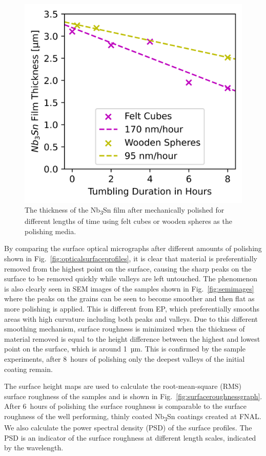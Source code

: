 \begin{figure}[t]%
\centering%
\includegraphics[width=0.8\columnwidth]{../doc/figs/Material_Removal_Graph.png}%
\caption{The thickness of the Nb\textsubscript{3}Sn film after mechanically polished for different lengths of time using felt cubes or wooden spheres as the polishing media.}%
\label{fig:materialremovalgraph}%
\end{figure}

By comparing the surface optical micrographs after different amounts of polishing shown in Fig.~\ref{fig:opticalsurfaceprofiles}, it is clear that material is preferentially removed from the highest point on the surface, causing the sharp peaks on the surface to be removed quickly while valleys are left untouched. The phenomenon is also clearly seen in SEM images of the samples shown in Fig.~\ref{fig:semimages} where the peaks on the grains can be seen to become smoother and then flat as more polishing is applied. This is different from EP, which preferentially smooths areas with high curvature including both peaks and valleys. Due to this different smoothing mechanism, surface roughness is minimized when the thickness of material removed is equal to the height difference between the highest and lowest point on the surface, which is around 1~µm. This is confirmed by the sample experiments, after 8~hours of polishing only the deepest valleys of the initial coating remain.

The surface height maps are used to calculate the root-mean-square (RMS) surface roughness of the samples and is shown in Fig.~\ref{fig:surfaceroughnessgraph}. After 6~hours of polishing the surface roughness is comparable to the surface roughness of the well performing, thinly coated Nb\textsubscript{3}Sn coatings created at FNAL\cite{posen2021advances}. We also calculate the power spectral density (PSD) of the surface profiles. The PSD is an indicator of the surface roughness at different length scales, indicated by the wavelength\cite{xu2011enhanced, pudasaini2017surface}.

